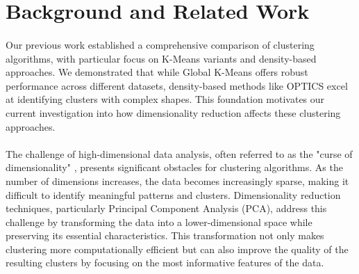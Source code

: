 \section{Background and Related Work}
\label{sec:background-and-related-work}

\paragraph{}
Our previous work \cite{our-clustering-work} established a comprehensive comparison 
of clustering algorithms, with particular focus on K-Means variants and density-based 
approaches. We demonstrated that while Global K-Means \cite{global_kmeans} offers 
robust performance across different datasets, density-based methods like OPTICS 
\cite{1999-optics} excel at identifying clusters with complex shapes. This foundation 
motivates our current investigation into how dimensionality reduction affects these 
clustering approaches.

\paragraph{}
The challenge of high-dimensional data analysis, often referred to as the "curse of 
dimensionality" \cite{dimensionality}, presents significant obstacles for clustering 
algorithms. As the number of dimensions increases, the data becomes increasingly sparse, 
making it difficult to identify meaningful patterns and clusters. Dimensionality 
reduction techniques, particularly Principal Component Analysis (PCA), address this 
challenge by transforming the data into a lower-dimensional space while preserving 
its essential characteristics. This transformation not only makes clustering more 
computationally efficient but can also improve the quality of the resulting clusters 
by focusing on the most informative features of the data.



